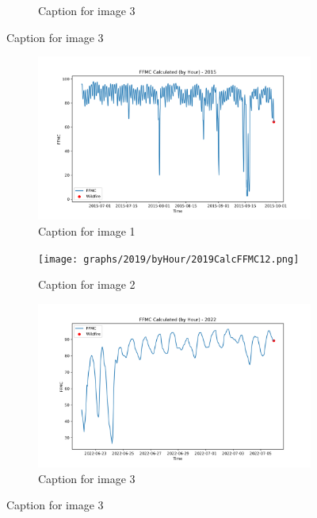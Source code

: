 \begin{figure}[h]
\begin{subfigure}{0.3\textwidth}
		\caption{Caption for image 3}
		\label{fig:img3}
	\end{subfigure}
	
	\label{fig:all_images}
\end{figure}

\begin{figure}[h]
	\centering
	\caption{Caption for the whole figure}
	\begin{subfigure}{0.3\textwidth}
		\centering
		\includegraphics[width=\textwidth]{graphs/2015/byHour/2015CalcFFMC12.png}
		\caption{Caption for image 1}
		\label{fig:img1}
	\end{subfigure}
	\hfill
	\begin{subfigure}{0.3\textwidth}
		\centering
		\texttt{[image: graphs/2019/byHour/2019CalcFFMC12.png]}
		\caption{Caption for image 2}
		\label{fig:img2}
	\end{subfigure}
	\hfill
	\begin{subfigure}{0.3\textwidth}
		\centering
		\includegraphics[width=\textwidth]{graphs/2022/2022CalcFFMC12.png}
		\caption{Caption for image 3}
		\label{fig:img3}
	\end{subfigure}
	
	\label{fig:all_images}
\end{figure}

